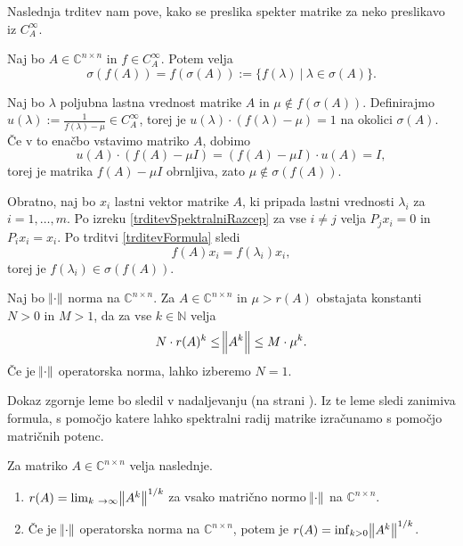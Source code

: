 \documentclass[mat1]{fmfdelo}
\newcommand{\N}{\mathbb N}
\newcommand{\C}{\mathbb C}
\begin{document}
Naslednja trditev nam pove, kako se preslika spekter matrike za neko preslikavo iz $C_A^\infty$.
\begin{izrek} \label{izrekOPreslikaviSpektra}
    Naj bo $A \in \C^{n \times n}$ in $f \in C_A^\infty$. Potem velja
    \begin{equation*}
        \sigma\left(f\left(A\right)\right) = f\left(\sigma\left(A\right)\right) := \{f(\lambda)\ |\ \lambda \in \sigma(A)\}.
    \end{equation*}
\end{izrek}
\begin{dokaz}
    Naj bo $\lambda$ poljubna lastna vrednost matrike $A$ in $\mu \notin f(\sigma(A))$. Definirajmo $u(\lambda) := \frac{1}{f(\lambda) - \mu} \in C_A^\infty$, torej je $u(\lambda) \cdot (f(\lambda) - \mu) = 1$ na okolici $\sigma(A)$. Če v to enačbo vstavimo matriko $A$, dobimo
    \begin{equation*}
        u(A) \cdot (f(A) - \mu I) = (f(A) - \mu I) \cdot u(A) = I,
    \end{equation*}
    torej je matrika $f(A) - \mu I$ obrnljiva, zato $\mu \notin \sigma(f(A))$.
    
    Obratno, naj bo $x_i$ lastni vektor matrike $A$, ki pripada lastni vrednosti $\lambda_i$ za $i = 1, \ldots, m$. Po izreku \ref{trditevSpektralniRazcep} za vse $i \neq j$ velja $P_j x_i = 0$ in $P_i x_i = x_i$. Po trditvi \ref{trditevFormula} sledi
    \begin{equation*}
        f(A) x_i = f(\lambda_i) x_i,
    \end{equation*}
    torej je $f(\lambda_i) \in \sigma(f(A))$.
\end{dokaz}

\begin{lema}\label{lemaNorme}
    Naj bo $\norm{\cdot}$ norma na $\C^{n \times n}$. Za $A \in \C^{n \times n}$ in $\mu > r(A)$ obstajata konstanti $N > 0$ in $M > 1$, da za vse $k \in \N$ velja
    \begin{equation*}\label{eqLemaNorme}
        N \cdot r(A)^k \leq \norm{A^k} \leq M \cdot \mu^k.
    \end{equation*}
    Če je $\norm{\cdot}$ operatorska norma, lahko izberemo $N = 1$.
\end{lema}
Dokaz zgornje leme bo sledil v nadaljevanju (na strani \pageref{dokazLemaNorme}). Iz te leme sledi zanimiva formula, s pomočjo katere lahko spektralni radij matrike izračunamo s pomočjo matričnih potenc.
\begin{trditev}  \label{gelfand}
    Za matriko $A \in \C^{n \times n}$ velja naslednje.
    \begin{enumerate}
        \item $r(A) = \lim_{k \rightarrow \infty} \norm{A^k}^{1/k}$ za vsako matrično normo $\norm{\cdot}$ na $\C^{n \times n}$.
        \item Če je $\norm{\cdot}$ operatorska norma na $\C^{n \times n}$, potem je $r(A) = \inf_{k > 0} \norm{A^k}^{1/k}$.
    \end{enumerate}
\end{trditev}
\end{document}
